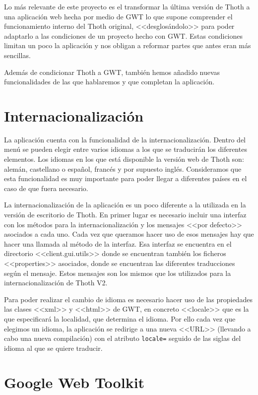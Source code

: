 
Lo más relevante de este proyecto es el transformar la última versión de Thoth a una aplicación web hecha por medio de GWT lo que supone comprender el funcionamiento interno del Thoth original, <<desglosándolo>> para poder adaptarlo a las condiciones de un proyecto hecho con GWT.
Estas condiciones limitan un poco la aplicación y nos obligan a reformar partes que antes eran más sencillas.

Además de condicionar Thoth a GWT, también hemos añadido nuevas funcionalidades de las que hablaremos y que completan la aplicación.



\section{Internacionalización}
La aplicación cuenta con la funcionalidad de la internacionalización. Dentro del menú se pueden elegir entre varios idiomas a los que se traducirán los diferentes elementos. Los idiomas en los que está disponible la versión web de Thoth son: alemán, castellano o español, francés y por supuesto inglés. Consideramos que esta funcionalidad es muy importante para poder llegar a diferentes países en el caso de que fuera necesario.

La internacionalización de la aplicación es un poco diferente a la utilizada en la versión de escritorio de Thoth. En primer lugar es necesario incluir una interfaz con los métodos para la internacionalización y los mensajes <<por defecto>> asociados a cada uno. Cada vez que queramos hacer uso de esos mensajes hay que hacer una llamada al método de la interfaz. Esa interfaz se encuentra en el directorio <<client.gui.utils>> donde se encuentran también los ficheros <<properties>> asociados, donde se encuentran las diferentes traducciones según el mensaje. Estos mensajes son los mismos que los utilizados para la internacionalización de Thoth V2.

Para poder realizar el cambio de idioma es necesario hacer uso de las propiedades las clases <<xml>> y <<html>> de GWT, en concreto <<locale>> que es la que especificará la localidad, que determina el idioma. Por ello cada vez que elegimos un idioma, la aplicación se redirige a una nueva <<URL>> (llevando a cabo una nueva compilación) con el atributo \texttt{locale=} seguido de las siglas del idioma al que se quiere traducir.

\section{Google Web Toolkit}

